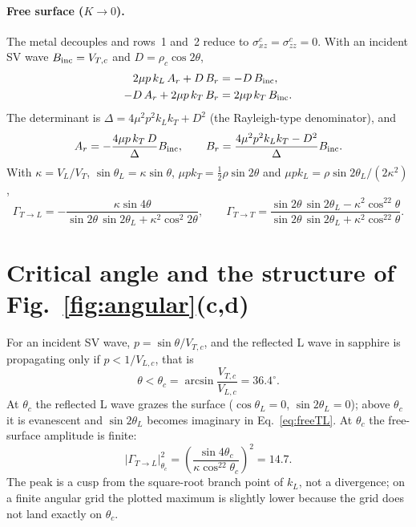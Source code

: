 \documentclass[11pt,a4paper]{article}
\begin{document}
\paragraph{Free surface ($K\to0$).} The metal decouples and rows~1 and~2 reduce to
$\sigma_{xz}^c=\sigma_{zz}^c=0$. With an incident SV wave $B_{\rm inc}=V_{T,c}$ and
$D=\rho_c\cos2\theta$,
\begin{align}
  2\mu p\,k_L\,A_r+D\,B_r&=-D\,B_{\rm inc},\\
  -D\,A_r+2\mu p\,k_T\,B_r&=2\mu p\,k_T\,B_{\rm inc}.
\end{align}
The determinant is $\Delta=4\mu^2p^2k_Lk_T+D^2$ (the Rayleigh-type denominator), and
\begin{equation}
  A_r=-\frac{4\mu p\,k_T\,D}{\Delta}B_{\rm inc},\qquad
  B_r=\frac{4\mu^2p^2k_Lk_T-D^2}{\Delta}B_{\rm inc}.
\end{equation}
With $\kappa=V_L/V_T$, $\sin\theta_L=\kappa\sin\theta$, $\mu pk_T=\tfrac12\rho\sin2\theta$ and
$\mu pk_L=\rho\sin2\theta_L/(2\kappa^2)$,
\begin{equation}
  \Gamma_{T\to L}=-\frac{\kappa\sin4\theta}{\sin2\theta\,\sin2\theta_L+\kappa^2\cos^2 2\theta},\qquad
  \Gamma_{T\to T}=\frac{\sin2\theta\,\sin2\theta_L-\kappa^2\cos^22\theta}{\sin2\theta\,\sin2\theta_L+\kappa^2\cos^22\theta}.
  \label{eq:freeTL}
\end{equation}

\section{Critical angle and the structure of Fig.~\ref{fig:angular}(c,d)}

For an incident SV wave, $p=\sin\theta/V_{T,c}$, and the reflected L wave in sapphire is
propagating only if $p<1/V_{L,c}$, that is
\begin{equation}
  \theta<\theta_c=\arcsin\frac{V_{T,c}}{V_{L,c}}=36.4^\circ .
\end{equation}
At $\theta_c$ the reflected L wave grazes the surface ($\cos\theta_L=0$,
$\sin2\theta_L=0$); above $\theta_c$ it is evanescent and $\sin2\theta_L$ becomes imaginary in
Eq.~\eqref{eq:freeTL}. At $\theta_c$ the free-surface amplitude is finite:
\begin{equation}
  |\Gamma_{T\to L}|^2_{\theta_c}=\left(\frac{\sin4\theta_c}{\kappa\cos^22\theta_c}\right)^{2}=14.7 .
\end{equation}
The peak is a cusp from the square-root branch point of $k_L$, not a divergence; on a finite
angular grid the plotted maximum is slightly lower because the grid does not land exactly on
$\theta_c$.
\end{document}
